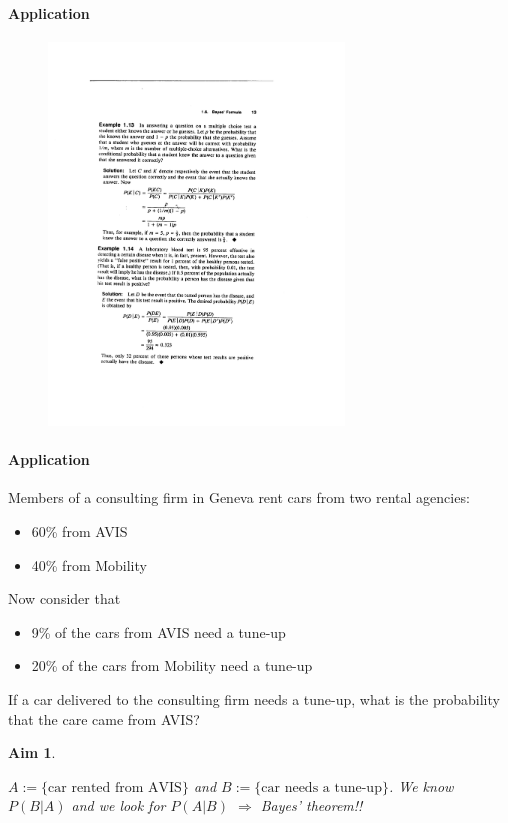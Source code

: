 \documentclass[notes=show,handout]{beamer}\usepackage[]{graphicx}\usepackage[]{color}
\newtheorem{aim}{Aim}[section]
\begin{document}
\begin{frame}{\secname}
\framesubtitle{Application}
  \begin{example}
  \begin{figure}[h!]
  \centering
  \includegraphics[width=0.7\textwidth,height=0.65\textheight]{img/Ross_Ex.pdf}
  \end{figure}
  \end{example}
\end{frame}

\begin{frame}{\secname}
\framesubtitle{Application}
  \begin{example}
  \begin{footnotesize}
  Members of a consulting firm in Geneva rent cars from two rental agencies:
  \begin{itemize}
  \item 60\% from AVIS
  \item 40\% from Mobility
  \end{itemize}
  Now consider that
  \begin{itemize}
  \item 9\% of the cars from AVIS need a tune-up
  \item 20\% of the cars from Mobility need a tune-up
  \end{itemize}
  If a car delivered to the consulting firm needs a tune-up, what is the probability that the care came
  from AVIS?
  \end{footnotesize}
  \end{example}
  \begin{aim}
  \begin{footnotesize}
  $A:=\{\text{car rented from AVIS}\}$ and $B:=\{\text{car needs a tune-up}\}$. We know $P(B\vert A)$ and we look for $P(A\vert B)$ $\Rightarrow$ Bayes' theorem!!
  \end{footnotesize}
  \end{aim}
\end{frame}
\end{document}
